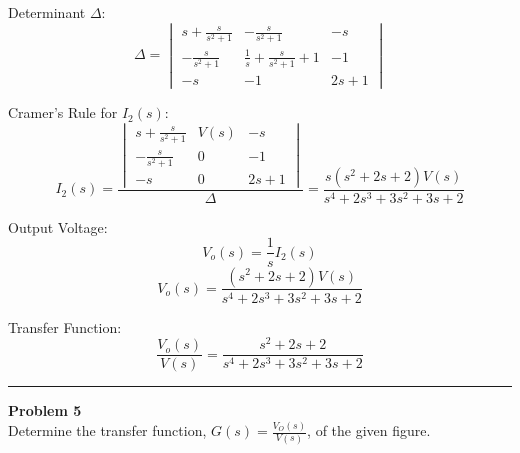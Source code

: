 \documentclass[11pt]{article}
\begin{document}
\bigskip

{Determinant \( \Delta \):}
\begingroup
\renewcommand{\arraystretch}{1.5}
\[
\Delta =
\begin{vmatrix}
\displaystyle s + \frac{s}{s^2 + 1} & \displaystyle - \frac{s}{s^2 + 1} & -s \\
\displaystyle - \frac{s}{s^2 + 1} & \displaystyle \frac{1}{s} + \frac{s}{s^2 + 1} + 1 & -1 \\
-s & -1 & 2s + 1
\end{vmatrix}
\]
\endgroup

\bigskip

{Cramer's Rule for \( I_2(s) \):}
\begingroup
\renewcommand{\arraystretch}{1.5}
\[
I_2(s) =
\frac{
\begin{vmatrix}
\displaystyle s + \frac{s}{s^2 + 1} & V(s) & -s \\
\displaystyle - \frac{s}{s^2 + 1} & 0 & -1 \\
-s & 0 & 2s + 1
\end{vmatrix}
}{
\Delta
}
= \frac{s(s^2 + 2s + 2) V(s)}{s^4 + 2s^3 + 3s^2 + 3s + 2}
\]
\endgroup

\bigskip

{Output Voltage:}
\[
V_o(s) = \frac{1}{s} I_2(s)
\]
\[
V_o(s) = \frac{(s^2 + 2s + 2) V(s)}{s^4 + 2s^3 + 3s^2 + 3s + 2}
\]

\bigskip

{Transfer Function:}
\[
\boxed{
\frac{V_o(s)}{V(s)} = \frac{s^2 + 2s + 2}{s^4 + 2s^3 + 3s^2 + 3s + 2}
}
\]

\newpage
  \setcounter{page}{8}
\noindent\rule{\textwidth}{1pt}
\noindent\textbf{Problem 5} \hfill 
\\ Determine the transfer function, $G(s) =\frac{V_O(s)}{V(s)}$, of the given figure.
\end{document}
